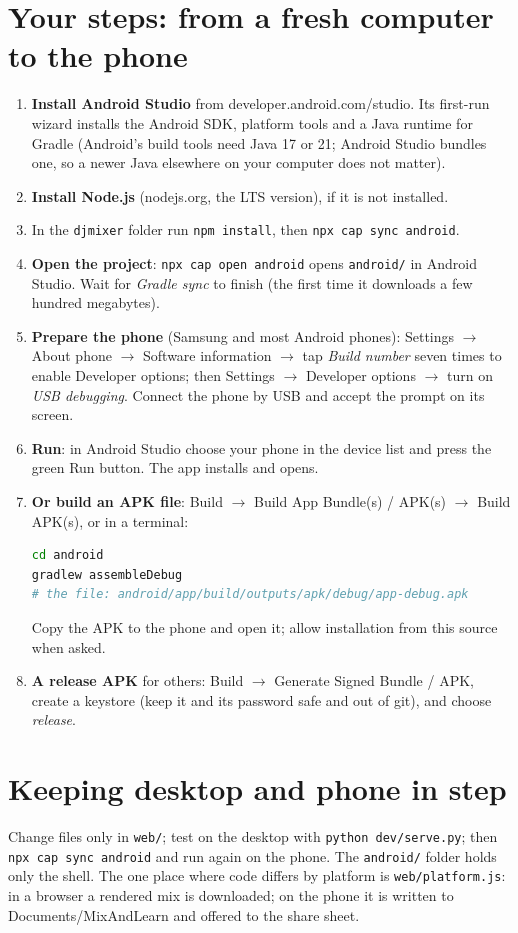\section{Your steps: from a fresh computer to the phone}
\begin{enumerate}
\item \textbf{Install Android Studio} from developer.android.com/studio. Its first-run wizard installs the Android SDK, platform tools and a Java runtime for Gradle (Android's build tools need Java 17 or 21; Android Studio bundles one, so a newer Java elsewhere on your computer does not matter).
\item \textbf{Install Node.js} (nodejs.org, the LTS version), if it is not installed.
\item In the \texttt{djmixer} folder run \texttt{npm install}, then \texttt{npx cap sync android}.
\item \textbf{Open the project}: \texttt{npx cap open android} opens \texttt{android/} in Android Studio. Wait for \emph{Gradle sync} to finish (the first time it downloads a few hundred megabytes).
\item \textbf{Prepare the phone} (Samsung and most Android phones): Settings $\to$ About phone $\to$ Software information $\to$ tap \emph{Build number} seven times to enable Developer options; then Settings $\to$ Developer options $\to$ turn on \emph{USB debugging}. Connect the phone by USB and accept the prompt on its screen.
\item \textbf{Run}: in Android Studio choose your phone in the device list and press the green Run button. The app installs and opens.
\item \textbf{Or build an APK file}: Build $\to$ Build App Bundle(s) / APK(s) $\to$ Build APK(s), or in a terminal:
\begin{lstlisting}[language=bash]
cd android
gradlew assembleDebug
# the file: android/app/build/outputs/apk/debug/app-debug.apk
\end{lstlisting}
Copy the APK to the phone and open it; allow installation from this source when asked.
\item \textbf{A release APK} for others: Build $\to$ Generate Signed Bundle / APK, create a keystore (keep it and its password safe and out of git), and choose \emph{release}.
\end{enumerate}

\section{Keeping desktop and phone in step}
Change files only in \texttt{web/}; test on the desktop with \texttt{python dev/serve.py}; then \texttt{npx cap sync android} and run again on the phone. The \texttt{android/} folder holds only the shell. The one place where code differs by platform is \texttt{web/platform.js}: in a browser a rendered mix is downloaded; on the phone it is written to Documents/MixAndLearn and offered to the share sheet.

